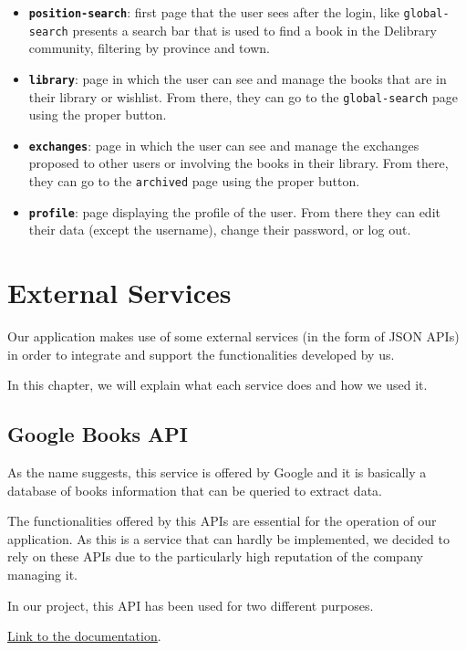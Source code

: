 \begin{itemize}
      \item \textbf{\texttt{position-search}}:
            first page that the user sees after the login, like \texttt{global-search} presents a search bar that is used to find a book
            in the Delibrary community, filtering by province and town.
      \item \textbf{\texttt{library}}:
            page in which the user can see and manage the books that are in their library or wishlist.
            From there, they can go to the \texttt{global-search} page using the proper button.
      \item \textbf{\texttt{exchanges}}:
            page in which the user can see and manage the exchanges proposed to other users or involving the books in their library.
            From there, they can go to the \texttt{archived} page using the proper button.
      \item \textbf{\texttt{profile}}:
            page displaying the profile of the user. From there they can edit their data (except the username), change their password, or log out.
\end{itemize}



\chapter{External Services}
Our application makes use of some external services (in the form of JSON APIs) in order to integrate and support the functionalities developed by us.

In this chapter, we will explain what each service does and how we used it.

\section{Google Books API}
As the name suggests, this service is offered by Google and it is basically a database of books information that can be queried to extract data.

The functionalities offered by this APIs are essential for the operation of our application.
As this is a service that can hardly be implemented, we decided to rely on these APIs due to the particularly high reputation of the company managing it.

In our project, this API has been used for two different purposes.

\underline{\href{https://developers.google.com/books}{Link to the documentation}}.

